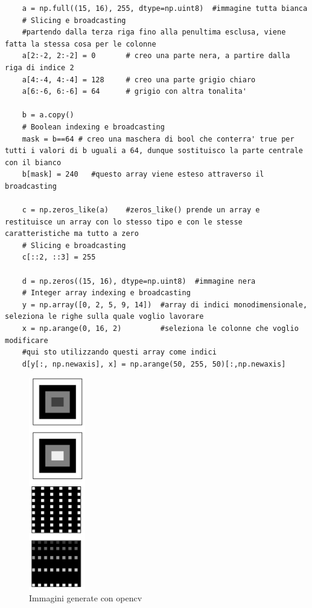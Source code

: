 \begin{lstlisting}
	a = np.full((15, 16), 255, dtype=np.uint8)	#immagine tutta bianca
	# Slicing e broadcasting
	#partendo dalla terza riga fino alla penultima esclusa, viene fatta la stessa cosa per le colonne
	a[2:-2, 2:-2] = 0		# creo una parte nera, a partire dalla riga di indice 2
	a[4:-4, 4:-4] = 128		# creo una parte grigio chiaro
	a[6:-6, 6:-6] = 64		# grigio con altra tonalita'

	b = a.copy()			
	# Boolean indexing e broadcasting
	mask = b==64 # creo una maschera di bool che conterra' true per tutti i valori di b uguali a 64, dunque sostituisco la parte centrale con il bianco
	b[mask] = 240	#questo array viene esteso attraverso il broadcasting

	c = np.zeros_like(a)	#zeros_like() prende un array e restituisce un array con lo stesso tipo e con le stesse caratteristiche ma tutto a zero
	# Slicing e broadcasting
	c[::2, ::3] = 255

	d = np.zeros((15, 16), dtype=np.uint8)	#immagine nera
	# Integer array indexing e broadcasting
	y = np.array([0, 2, 5, 9, 14])	#array di indici monodimensionale, seleziona le righe sulla quale voglio lavorare
	x = np.arange(0, 16, 2)			#seleziona le colonne che voglio modificare
	#qui sto utilizzando questi array come indici
	d[y[:, np.newaxis], x] = np.arange(50, 255, 50)[:,np.newaxis]
\end{lstlisting}

\begin{figure}[htp]
	\includegraphics[width=70pt]{./immagini/opencv_images2.png}
	\caption{Immagini generate con opencv}
	\label{img:opencv_images2}
\end{figure}

